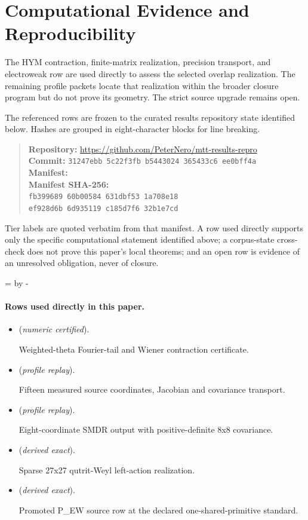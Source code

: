 \documentclass[11pt]{article}
\begin{document}
\section*{Computational Evidence and Reproducibility}
The HYM contraction, finite-matrix realization, precision transport, and electroweak row are used directly to assess the selected overlap realization. The remaining profile packets locate that realization within the broader closure program but do not prove its geometry. The strict source upgrade remains open.

The referenced rows are frozen to the curated results repository state identified below. Hashes are grouped in eight-character blocks for line breaking.
\begin{quote}\small
\textbf{Repository:} \url{https://github.com/PeterNero/mtt-results-repro}\\
\textbf{Commit:} \texttt{31247ebb 5c22f3fb b5443024 365433c6 ee0bff4a}\\
\textbf{Manifest:} \\
\textbf{Manifest SHA-256:}\\
\texttt{fb399689 60b00584 631dbf53 1a708e18}\\
\texttt{ef928d6b 6d935119 c185d7f6 32b1e7cd}
\end{quote}

Tier labels are quoted verbatim from that manifest. A row used directly supports only the specific computational statement identified above; a corpus-state cross-check does not prove this paper's local theorems; and an open row is evidence of an unresolved obligation, never of closure.

\par\begingroup{}=\pagegoal\advance{} by -\pagetotal\ifdim\dimen0<7\baselineskip\newpage\fi\endgroup
\paragraph{Rows used directly in this paper.}
\begin{itemize}
\setlength{\itemsep}{0.25em}
\item {} (\emph{numeric certified}).\par Weighted-theta Fourier-tail and Wiener contraction certificate.
\item {} (\emph{profile replay}).\par Fifteen measured source coordinates, Jacobian and covariance transport.
\item {} (\emph{profile replay}).\par Eight-coordinate SMDR output with positive-definite 8x8 covariance.
\item {} (\emph{derived exact}).\par Sparse 27x27 qutrit-Weyl left-action realization.
\item {} (\emph{derived exact}).\par Promoted P\_EW source row at the declared one-shared-primitive standard.
\end{itemize}
\end{document}
